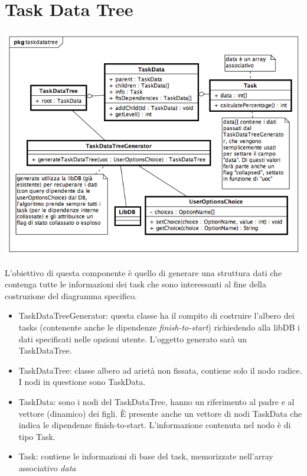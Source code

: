 \documentclass[a4paper, 12pt]{report}
\begin{document}
\section{Task Data Tree}
\includegraphics[width=\textwidth]{chart/TaskDataTree.png}

L'obiettivo di questa componente \`e quello di generare una struttura dati che contenga tutte le informazioni dei task che sono interessanti al fine della costruzione del diagramma specifico.
\begin{itemize}
	\item TaskDataTreeGenerator: questa classe ha il compito di costruire l'albero dei tasks (contenente anche le dipendenze \emph{finish-to-start}) richiedendo alla libDB i dati specificati nelle opzioni utente. L'oggetto generato sar\`a un TaskDataTree.
	\item TaskDataTree: classe albero ad ariet\`a non fissata, contiene solo il nodo radice. I nodi in questione sono TaskData.
	\item TaskData: sono i nodi del TaskDataTree, hanno un riferimento al padre e al vettore (dinamico) dei figli. \`E presente anche un vettore di nodi TaskData che indica le dipendenze finish-to-start. L'informazione contenuta nel nodo \`e di tipo Task.
	\item Task: contiene le informazioni di base del task, memorizzate nell'array associativo \emph{data}
\end{itemize}
\end{document}

